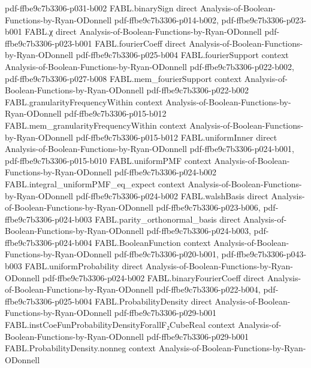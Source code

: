 \begin{theorem}
  {pdf-ffbe9c7b3306-p031-b002}
\proofstep
  {FABL.binarySign}
  {direct}
  {Analysis-of-Boolean-Functions-by-Ryan-ODonnell}
  {pdf-ffbe9c7b3306-p014-b002,
    pdf-ffbe9c7b3306-p023-b001}
\proofstep
  {FABL.χ}
  {direct}
  {Analysis-of-Boolean-Functions-by-Ryan-ODonnell}
  {pdf-ffbe9c7b3306-p023-b001}
\proofstep
  {FABL.fourierCoeff}
  {direct}
  {Analysis-of-Boolean-Functions-by-Ryan-ODonnell}
  {pdf-ffbe9c7b3306-p025-b004}
\proofstep
  {FABL.fourierSupport}
  {context}
  {Analysis-of-Boolean-Functions-by-Ryan-ODonnell}
  {pdf-ffbe9c7b3306-p022-b002,
    pdf-ffbe9c7b3306-p027-b008}
\proofstep
  {FABL.mem_fourierSupport}
  {context}
  {Analysis-of-Boolean-Functions-by-Ryan-ODonnell}
  {pdf-ffbe9c7b3306-p022-b002}
\proofstep
  {FABL.granularityFrequencyWithin}
  {context}
  {Analysis-of-Boolean-Functions-by-Ryan-ODonnell}
  {pdf-ffbe9c7b3306-p015-b012}
\proofstep
  {FABL.mem_granularityFrequencyWithin}
  {context}
  {Analysis-of-Boolean-Functions-by-Ryan-ODonnell}
  {pdf-ffbe9c7b3306-p015-b012}
\proofstep
  {FABL.uniformInner}
  {direct}
  {Analysis-of-Boolean-Functions-by-Ryan-ODonnell}
  {pdf-ffbe9c7b3306-p024-b001,
    pdf-ffbe9c7b3306-p015-b010}
\proofstep
  {FABL.uniformPMF}
  {context}
  {Analysis-of-Boolean-Functions-by-Ryan-ODonnell}
  {pdf-ffbe9c7b3306-p024-b002}
\proofstep
  {FABL.integral_uniformPMF_eq_expect}
  {context}
  {Analysis-of-Boolean-Functions-by-Ryan-ODonnell}
  {pdf-ffbe9c7b3306-p024-b002}
\proofstep
  {FABL.walshBasis}
  {direct}
  {Analysis-of-Boolean-Functions-by-Ryan-ODonnell}
  {pdf-ffbe9c7b3306-p023-b006,
    pdf-ffbe9c7b3306-p024-b003}
\proofstep
  {FABL.parity_orthonormal_basis}
  {direct}
  {Analysis-of-Boolean-Functions-by-Ryan-ODonnell}
  {pdf-ffbe9c7b3306-p024-b003,
    pdf-ffbe9c7b3306-p024-b004}
\proofstep
  {FABL.BooleanFunction}
  {context}
  {Analysis-of-Boolean-Functions-by-Ryan-ODonnell}
  {pdf-ffbe9c7b3306-p020-b001,
    pdf-ffbe9c7b3306-p043-b003}
\proofstep
  {FABL.uniformProbability}
  {direct}
  {Analysis-of-Boolean-Functions-by-Ryan-ODonnell}
  {pdf-ffbe9c7b3306-p024-b002}
\proofstep
  {FABL.binaryFourierCoeff}
  {direct}
  {Analysis-of-Boolean-Functions-by-Ryan-ODonnell}
  {pdf-ffbe9c7b3306-p022-b004,
    pdf-ffbe9c7b3306-p025-b004}
\proofstep
  {FABL.ProbabilityDensity}
  {direct}
  {Analysis-of-Boolean-Functions-by-Ryan-ODonnell}
  {pdf-ffbe9c7b3306-p029-b001}
\proofstep
  {FABL.instCoeFunProbabilityDensityForallF₂CubeReal}
  {context}
  {Analysis-of-Boolean-Functions-by-Ryan-ODonnell}
  {pdf-ffbe9c7b3306-p029-b001}
\proofstep
  {FABL.ProbabilityDensity.nonneg}
  {context}
  {Analysis-of-Boolean-Functions-by-Ryan-ODonnell}

\end{theorem}
